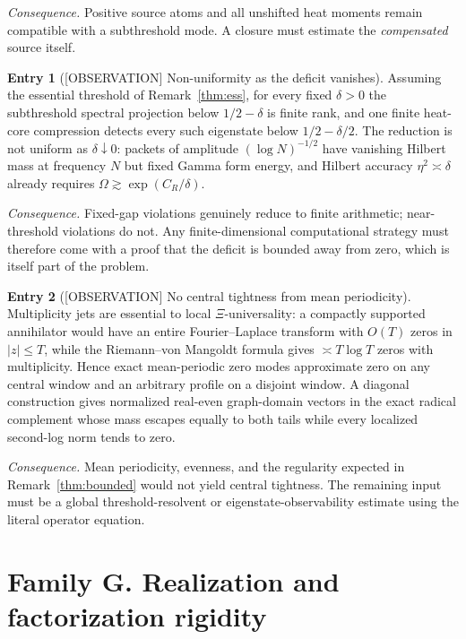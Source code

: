 \documentclass[11pt]{amsart}
\theoremstyle{definition}
\newcounter{family}
\newtheorem{entry}{Entry}[family]
\theoremstyle{remark}
\newcommand{\XiR}{\Xi}
\newcommand{\OBS}{\textup{[OBSERVATION]}}
\begin{document}
\emph{Consequence.} Positive source atoms and all unshifted heat moments
remain compatible with a subthreshold mode.  A closure must estimate the
\emph{compensated} source itself.

\begin{entry}[\OBS{} Non-uniformity as the deficit vanishes]
\label{ent:F5}
Assuming the essential threshold of Remark~\ref{thm:ess}, for every fixed
\(\delta>0\) the subthreshold spectral projection below
\(1/2-\delta\) is finite rank, and one finite heat-core compression detects
every such eigenstate below \(1/2-\delta/2\).  The reduction is not
uniform as \(\delta\downarrow0\): packets of amplitude \((\log N)^{-1/2}\)
have vanishing Hilbert mass at frequency \(N\) but fixed Gamma form
energy, and Hilbert accuracy \(\eta^2\asymp\delta\) already requires
\(\Omega\gtrsim\exp(C_R/\delta)\).
\end{entry}

\emph{Consequence.} Fixed-gap violations genuinely reduce to finite
arithmetic; near-threshold violations do not.  Any finite-dimensional
computational strategy must therefore come with a proof that the deficit
is bounded away from zero, which is itself part of the problem.

\begin{entry}[\OBS{} No central tightness from mean periodicity]
\label{ent:F6}
Multiplicity jets are essential to local \(\XiR\)-universality: a
compactly supported annihilator would have an entire Fourier--Laplace
transform with \(O(T)\) zeros in \(|z|\le T\), while the Riemann--von
Mangoldt formula \cite[Theorem~9.4]{Titchmarsh} gives
\(\asymp T\log T\) zeros with multiplicity.  Hence exact mean-periodic
zero modes approximate zero on any central window and an arbitrary profile
on a disjoint window.  A diagonal construction gives normalized real-even
graph-domain vectors in the exact radical complement whose mass escapes
equally to both tails while every localized second-log norm tends to zero.
\end{entry}

\emph{Consequence.} Mean periodicity, evenness, and the regularity
expected in Remark~\ref{thm:bounded} would not yield central tightness.  The remaining
input must be a global threshold-resolvent or eigenstate-observability
estimate using the literal operator equation.

\section{Family G. Realization and factorization rigidity}
\end{document}
